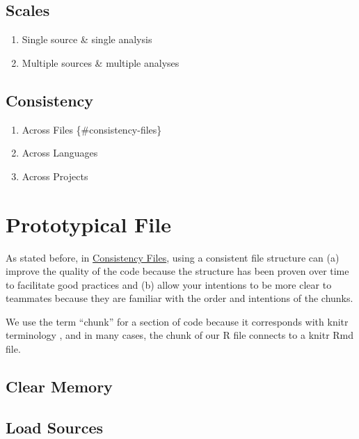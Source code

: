 \documentclass[]{book}
\providecommand{\tightlist}{%
  \setlength{\itemsep}{0pt}\setlength{\parskip}{0pt}}
\begin{document}
\hypertarget{scales}{%
\section{Scales}\label{scales}}

\begin{enumerate}
\def\labelenumi{\arabic{enumi}.}
\tightlist
\item
  Single source \& single analysis
\item
  Multiple sources \& multiple analyses
\end{enumerate}

\hypertarget{consistency}{%
\section{Consistency}\label{consistency}}

\begin{enumerate}
\def\labelenumi{\arabic{enumi}.}
\tightlist
\item
  Across Files \{\#consistency-files\}
\item
  Across Languages
\item
  Across Projects
\end{enumerate}

\hypertarget{file-prototype}{%
\chapter{Prototypical File}\label{file-prototype}}

As stated before, in \protect\hyperlink{consistency-files}{Consistency Files}, using a consistent file structure can (a) improve the quality of the code because the structure has been proven over time to facilitate good practices and (b) allow your intentions to be more clear to teammates because they are familiar with the order and intentions of the chunks.

We use the term ``chunk'' for a section of code because it corresponds with knitr terminology \citep{xie2015}, and in many cases, the chunk of our R file connects to a knitr Rmd file.

\hypertarget{clear-memory}{%
\section{Clear Memory}\label{clear-memory}}

\hypertarget{load-sources}{%
\section{Load Sources}\label{load-sources}}
\end{document}
